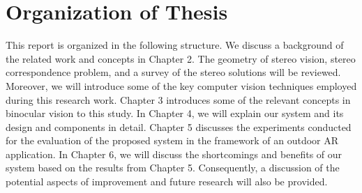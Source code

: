 \section{Organization of Thesis}
This report is organized in the following structure.
We discuss a background of the related work and concepts in Chapter 2. The geometry of stereo vision, 
stereo correspondence problem, and a survey of the stereo solutions will be reviewed. 
Moreover, we will introduce some of the key computer vision techniques employed
during this research work. Chapter 3 introduces some of the relevant concepts in binocular vision to this study.
In Chapter 4, we will explain our system and its design and components in detail. Chapter 5 discusses the experiments
conducted for the evaluation of the proposed system in the framework of an outdoor AR application.
In Chapter 6, we will discuss the shortcomings and benefits of our system based on the results from Chapter 5. 
Consequently, a discussion of the potential aspects of improvement 
and future research will also be provided.

